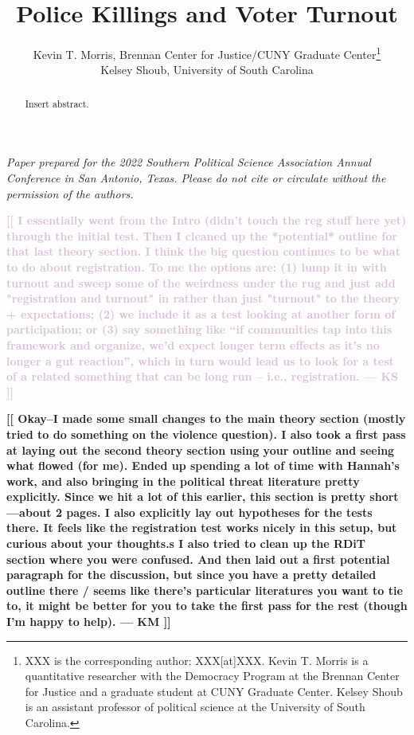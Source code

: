 \documentclass[12pt]{article}
\title{Police Killings and Voter Turnout \vspace{1in}}
\author{Kevin T. Morris, Brennan Center for Justice/CUNY Graduate Center\thanks{XXX is the corresponding author: XXX[at]XXX. Kevin T. Morris is a quantitative researcher with the Democracy Program at the Brennan Center for Justice and a graduate student at CUNY Graduate Center. Kelsey Shoub is an assistant professor of political science at the University of South Carolina.} \\ Kelsey Shoub, University of South Carolina}
\date{}
\newcommand{\kscomment}[1]{\textbf{\textcolor{Thistle}{[[ #1 --- KS ]]}}}
\newcommand{\kmcomment}[1]{\textbf{\textcolor{JungleGreen}{[[ #1 --- KM ]]}}}
\begin{document}
\setcounter{page}{0}
\clearpage
\maketitle
\thispagestyle{empty}

\renewcommand{\abstractname}{\vspace{-\baselineskip}}
\begin{abstract}
\noindent Insert abstract.
\end{abstract}

\vspace{1cm}

\noindent \textit{Paper prepared for the 2022 Southern Political Science Association Annual Conference in San Antonio, Texas. Please do not cite or circulate without the permission of the authors.}

\pagestyle{plain}

\newpage
\doublespacing

\kscomment{I essentially went from the Intro (didn't touch the reg stuff here yet) through the initial test. Then I cleaned up the *potential* outline for that last theory section. I think the big question continues to be what to do about registration. To me the options are: (1) lump it in with turnout and sweep some of the weirdness under the rug and just add "registration and turnout" in rather than just "turnout" to the theory + expectations; (2) we include it as a test looking at another form of participation; or (3) say something like ``if communities tap into this framework and organize, we'd expect longer term effects as it's no longer a gut reaction'', which in turn would lead us to look for a test of a related something that can be long run -- i.e., registration.}

\kmcomment{Okay--I made some small changes to the main theory section (mostly tried to do something on the violence question). I also took a first pass at laying out the second theory section using your outline and seeing what flowed (for me). Ended up spending a lot of time with Hannah's work, and also bringing in the political threat literature pretty explicitly. Since we hit a lot of this earlier, this section is pretty short---about 2 pages. I also explicitly lay out hypotheses for the tests there. It feels like the registration test works nicely in this setup, but curious about your thoughts.s I also tried to clean up the RDiT section where you were confused. And then laid out a first potential paragraph for the discussion, but since you have a pretty detailed outline there / seems like there's particular literatures you want to tie to, it might be better for you to take the first pass for the rest (though I'm happy to help).}
\end{document}

